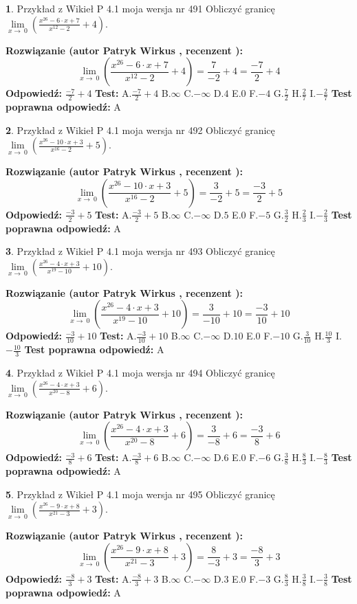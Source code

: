 \documentclass[12pt, a4paper]{article}
\theoremstyle{definition} %
\newtheorem{zad}{}
\newcommand{\zadStart}[1]{\begin{zad}#1\newline}
\newcommand{\zadStop}{\end{zad}}
\newcommand{\rozwStart}[2]{\noindent \textbf{Rozwiązanie (autor #1 , recenzent #2): }\newline}
\newcommand{\rozwStop}{\newline}
\newcommand{\odpStart}{\noindent \textbf{Odpowiedź:}\newline}
\newcommand{\odpStop}{\newline}
\newcommand{\testStart}{\noindent \textbf{Test:}\newline}
\newcommand{\testStop}{\newline}
\newcommand{\kluczStart}{\noindent \textbf{Test poprawna odpowiedź:}\newline}
\newcommand{\kluczStop}{\newline}
\begin{document}
\zadStart{Przykład z Wikieł P 4.1 moja wersja nr 491}
Obliczyć granicę $\lim\limits_{x\to\ 0}(\frac{x^{26}-6 \cdot x +7}{x^{12}-2}+4)$.
\zadStop
\rozwStart{Patryk Wirkus}{}
$$\lim\limits_{x\to\ 0}(\frac{x^{26}-6 \cdot x +7}{x^{12}-2}+4)=\frac{7}{-2}+4=\frac{-7}{2}+4$$
\rozwStop
\odpStart
$\frac{-7}{2}+4$
\odpStop
\testStart
A.$\frac{-7}{2}+4$
B.$\infty$
C.$-\infty$
D.$4$
E.$0$
F.$-4$
G.$\frac{7}{2}$
H.$\frac{2}{7}$
I.$-\frac{2}{7}$
\testStop
\kluczStart
A
\kluczStop



\zadStart{Przykład z Wikieł P 4.1 moja wersja nr 492}
Obliczyć granicę $\lim\limits_{x\to\ 0}(\frac{x^{26}-10 \cdot x +3}{x^{16}-2}+5)$.
\zadStop
\rozwStart{Patryk Wirkus}{}
$$\lim\limits_{x\to\ 0}(\frac{x^{26}-10 \cdot x +3}{x^{16}-2}+5)=\frac{3}{-2}+5=\frac{-3}{2}+5$$
\rozwStop
\odpStart
$\frac{-3}{2}+5$
\odpStop
\testStart
A.$\frac{-3}{2}+5$
B.$\infty$
C.$-\infty$
D.$5$
E.$0$
F.$-5$
G.$\frac{3}{2}$
H.$\frac{2}{3}$
I.$-\frac{2}{3}$
\testStop
\kluczStart
A
\kluczStop



\zadStart{Przykład z Wikieł P 4.1 moja wersja nr 493}
Obliczyć granicę $\lim\limits_{x\to\ 0}(\frac{x^{26}-4 \cdot x +3}{x^{19}-10}+10)$.
\zadStop
\rozwStart{Patryk Wirkus}{}
$$\lim\limits_{x\to\ 0}(\frac{x^{26}-4 \cdot x +3}{x^{19}-10}+10)=\frac{3}{-10}+10=\frac{-3}{10}+10$$
\rozwStop
\odpStart
$\frac{-3}{10}+10$
\odpStop
\testStart
A.$\frac{-3}{10}+10$
B.$\infty$
C.$-\infty$
D.$10$
E.$0$
F.$-10$
G.$\frac{3}{10}$
H.$\frac{10}{3}$
I.$-\frac{10}{3}$
\testStop
\kluczStart
A
\kluczStop



\zadStart{Przykład z Wikieł P 4.1 moja wersja nr 494}
Obliczyć granicę $\lim\limits_{x\to\ 0}(\frac{x^{26}-4 \cdot x +3}{x^{20}-8}+6)$.
\zadStop
\rozwStart{Patryk Wirkus}{}
$$\lim\limits_{x\to\ 0}(\frac{x^{26}-4 \cdot x +3}{x^{20}-8}+6)=\frac{3}{-8}+6=\frac{-3}{8}+6$$
\rozwStop
\odpStart
$\frac{-3}{8}+6$
\odpStop
\testStart
A.$\frac{-3}{8}+6$
B.$\infty$
C.$-\infty$
D.$6$
E.$0$
F.$-6$
G.$\frac{3}{8}$
H.$\frac{8}{3}$
I.$-\frac{8}{3}$
\testStop
\kluczStart
A
\kluczStop



\zadStart{Przykład z Wikieł P 4.1 moja wersja nr 495}
Obliczyć granicę $\lim\limits_{x\to\ 0}(\frac{x^{26}-9 \cdot x +8}{x^{21}-3}+3)$.
\zadStop
\rozwStart{Patryk Wirkus}{}
$$\lim\limits_{x\to\ 0}(\frac{x^{26}-9 \cdot x +8}{x^{21}-3}+3)=\frac{8}{-3}+3=\frac{-8}{3}+3$$
\rozwStop
\odpStart
$\frac{-8}{3}+3$
\odpStop
\testStart
A.$\frac{-8}{3}+3$
B.$\infty$
C.$-\infty$
D.$3$
E.$0$
F.$-3$
G.$\frac{8}{3}$
H.$\frac{3}{8}$
I.$-\frac{3}{8}$
\testStop
\kluczStart
A
\kluczStop
\end{document}

